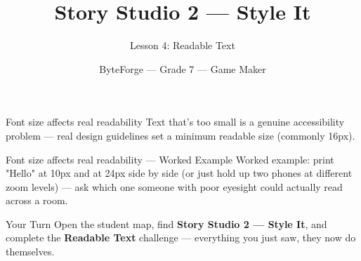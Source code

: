 \documentclass[aspectratio=169]{beamer}
\title{Story Studio 2 — Style It}
\subtitle{Lesson 4: Readable Text}
\author{ByteForge --- Grade 7 --- Game Maker}
\date{}
\begin{document}
\begin{frame}
    \titlepage
\end{frame}

\begin{frame}{Font size affects real readability}
    \Large
    Text that's too small is a genuine accessibility problem — real design guidelines set a minimum readable size (commonly 16px).
\end{frame}

\begin{frame}{Font size affects real readability --- Worked Example}
    \Large
    Worked example: print "Hello" at 10px and at 24px side by side (or just hold up two phones at different zoom levels) — ask which one someone with poor eyesight could actually read across a room.
\end{frame}

\begin{frame}{Your Turn}
    \Large
    Open the student map, find \textbf{Story Studio 2 — Style It}, and complete
    the \textbf{Readable Text} challenge --- everything you just saw, they now do themselves.
\end{frame}
\end{document}
